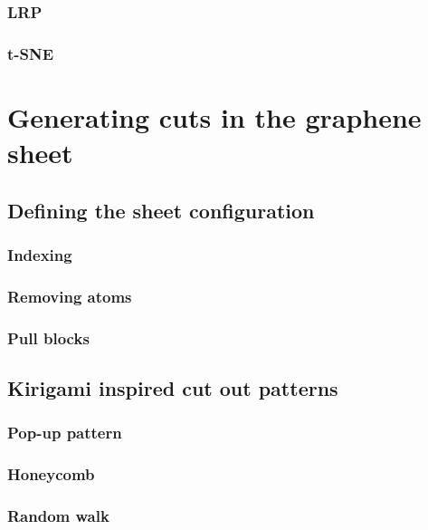 \subsubsection{LRP}
\subsubsection{t-SNE}



\section{Generating cuts in the graphene sheet}
\subsection{Defining the sheet configuration}
\subsubsection{Indexing}
\subsubsection{Removing atoms}
\subsubsection{Pull blocks}
\subsection{Kirigami inspired cut out patterns}
\subsubsection{Pop-up pattern}
\subsubsection{Honeycomb}
\subsubsection{Random walk}

